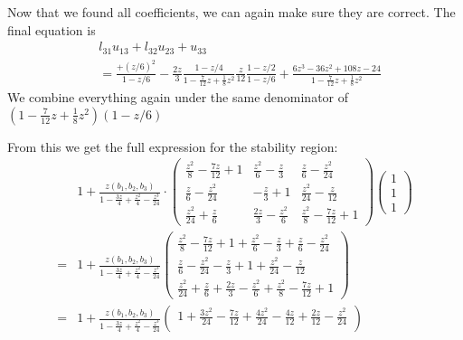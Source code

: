 \documentclass[10pt,a4paper]{article}
\begin{document}
Now that we found all coefficients, we can again make sure they are correct. The final equation is
\begin{align*}
  &l_{31}u_{13} + l_{32}u_{23} + u_{33} \\
  &= \frac{+(z/6)^2}{1-z/6} - \frac{2z}{3}\frac{1-z/4}{1 - \frac{7}{12}z + \frac{1}{8}z^2} \frac{z}{12}\frac{1-z/2}{1-z/6} + \frac{6z^3 - 36z^2 + 108z - 24}{1 - \frac{7}{12}z + \frac{1}{8}z^2}
\end{align*}
We combine everything again under the same denominator of $(1-\frac{7}{12}z+\frac{1}{8}z^2)(1-z/6)$


From this we get the full expression for the stability region:
\begin{align*}
  &1 + \frac{z (b_1, b_2, b_3)}{1 - \frac{3z}{4} + \frac{z^2}{4} - \frac{z^3}{24}}\cdot   \begin{pmatrix}
    \frac{z^2}{8} - \frac{7z}{12}+1 & \frac{z^2}{6} - \frac{z}{3} & \frac{z}{6} - \frac{z^2}{24} \\
    \frac{z}{6} - \frac{z^2}{24} & -\frac{z}{3} + 1 & \frac{z^2}{24} - \frac{z}{12} \\
                                                                                           \frac{z^2}{24} + \frac{z}{6} & \frac{2z}{3} - \frac{z^2}{6} & \frac{z^2}{8} - \frac{7z}{12} + 1
                                                                                         \end{pmatrix}
  \begin{pmatrix}
    1 \\
    1 \\
    1
  \end{pmatrix} \\
  =&
  1 + \frac{z (b_1, b_2, b_3)}{1 - \frac{3z}{4} + \frac{z^2}{4} - \frac{z^3}{24}}
  \begin{pmatrix}
    \frac{z^2}{8}-\frac{7z}{12}+1 + \frac{z^2}{6} - \frac{z}{3} + \frac{z}{6} - \frac{z^2}{24} \\
    \frac{z}{6} - \frac{z^2}{24} - \frac{z}{3} + 1 + \frac{z^2}{24} - \frac{z}{12} \\
    \frac{z^2}{24} + \frac{z}{6} + \frac{2z}{3} - \frac{z^2}{6} + \frac{z^2}{8} - \frac{7z}{12} + 1
  \end{pmatrix} \\
  =&
   1 + \frac{z (b_1, b_2, b_3)}{1 - \frac{3z}{4} + \frac{z^2}{4} - \frac{z^3}{24}}
   \begin{pmatrix}
     1 + \frac{3z^2}{24}-\frac{7z}{12} + \frac{4z^2}{24} - \frac{4z}{12} + \frac{2z}{12} - \frac{z^2}{24} \\

\end{pmatrix}
\end{align*}
\end{document}
